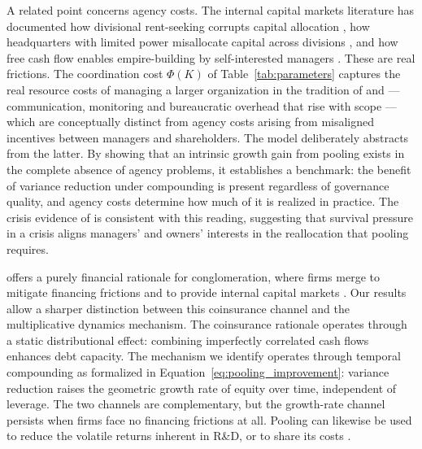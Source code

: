 A related point concerns agency costs. The internal capital markets literature has documented how divisional rent-seeking corrupts capital allocation \parencite{scharfstein2000dark}, how headquarters with limited power misallocate capital across divisions \parencite{rajan2000cost}, and how free cash flow enables empire-building by self-interested managers \parencite{jensen1986agency}. These are real frictions. The coordination cost $\Phi(K)$ of Table~\ref{tab:parameters} captures the real resource costs of managing a larger organization in the tradition of \textcite{coase19883} and \textcite{williamson1967hierarchical} --- communication, monitoring and bureaucratic overhead that rise with scope --- which are conceptually distinct from agency costs arising from misaligned incentives between managers and shareholders. The model deliberately abstracts from the latter. By showing that an intrinsic growth gain from pooling exists in the complete absence of agency problems, it establishes a benchmark: the benefit of variance reduction under compounding is present regardless of governance quality, and agency costs determine how much of it is realized in practice. The crisis evidence of \textcite{kuppuswamy2016does} is consistent with this reading, suggesting that survival pressure in a crisis aligns managers' and owners' interests in the reallocation that pooling requires.

\textcite{lewellen1971pure} offers a purely financial rationale for conglomeration, where firms merge to mitigate financing frictions and to provide internal capital markets \parencite{boguth2022dissecting}. Our results allow a sharper distinction between this coinsurance channel and the multiplicative dynamics mechanism. The coinsurance rationale operates through a static distributional effect: combining imperfectly correlated cash flows enhances debt capacity. The mechanism we identify operates through temporal compounding as formalized in Equation~\ref{eq:pooling_improvement}: variance reduction raises the geometric growth rate of equity over time, independent of leverage. The two channels are complementary, but the growth-rate channel persists when firms face no financing frictions at all. Pooling can likewise be used to reduce the volatile returns inherent in R\&D, or to share its costs \parencite{felton1971conglomerate}.

